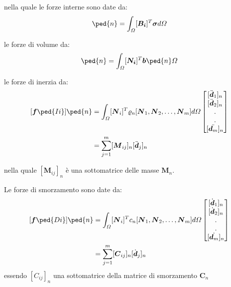 nella quale le forze interne sono date da:
\begin{equation}
	[\boldsymbol{p}\ped{i}]\ped{n} = \int_\varOmega[\boldsymbol{B_i}]^T\boldsymbol{\sigma}d\varOmega
\end{equation}

le forze di volume da:
\begin{equation}
	[\boldsymbol{f}\ped{Bi}]\ped{n} = \int_\varOmega[\boldsymbol{N_i}]^T\boldsymbol{b}\ped{n}\varOmega
\end{equation}

le forze di inerzia da:
\begin{equation}
	\begin{split}
	[\boldsymbol{f}\ped{Ii}]\ped{n} & = \int_\varOmega[\boldsymbol{N}_i]^T\varrho_n[\boldsymbol{N}_1,\boldsymbol{N}_2, \dots, \boldsymbol{N}_m]d\varOmega 		
	\begin{bmatrix}
		[\ddot{\boldsymbol{d}}_1]_n \\
		[\ddot{\boldsymbol{d}}_2]_n \\
		. \\
		. \\
		[\ddot{\boldsymbol{d}_m}]_n
	\end{bmatrix}	\\
	& = \sum_{j=1}^{m}[\boldsymbol{M}_{ij}]_n[\ddot{\boldsymbol{d}}_j]_n
	\end{split}
\end{equation}

nella quale $[\boldsymbol{M}_{ij}]_n$ è una sottomatrice delle masse $\mathbf{M}_n$.

Le forze di smorzamento sono date da:
\begin{equation}
	\begin{split}		
	[\boldsymbol{f}\ped{Di}]\ped{n} & = \int_\varOmega[\boldsymbol{N}_i]^Tc_n[\boldsymbol{N}_1,\boldsymbol{N}_2, \dots, \boldsymbol{N}_m]d\varOmega 		
	\begin{bmatrix}
		[\dot{\boldsymbol{d}}_1]_n \\
		[\dot{\boldsymbol{d}}_2]_n \\
		. \\
		. \\
		[\dot{\boldsymbol{d}_m}]_n
	\end{bmatrix} \\	
	& = \sum_{j=1}^{m}[\boldsymbol{C}_{ij}]_n[\dot{\boldsymbol{d}}_j]_n
	\end{split}
\end{equation}
essendo $[C_{ij}]_n$ una sottomatrice della matrice di smorzamento $\mathbf{C}_n$

